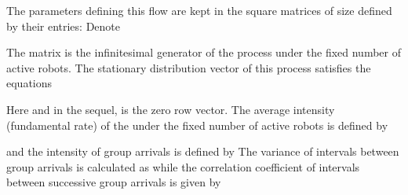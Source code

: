 \documentclass[11pt]{article}
\begin{document}
The parameters defining this flow are kept in the square matrices
 of size  defined by their entries:
 Denote


The matrix  is the infinitesimal generator of
the process  under the fixed number  of
active robots. The stationary distribution vector  of this process satisfies the equations
   
 Here and in the sequel,  is the zero row vector.
 The average intensity  (fundamental rate) of the  under the fixed number  of
active robots is defined by

 and the intensity  of group arrivals is defined
 by 
 The variance  of  intervals between group arrivals is calculated as
 while the correlation coefficient
 of intervals between successive group arrivals is
given by
\end{document}
